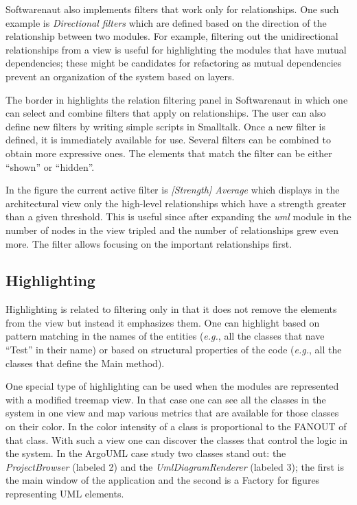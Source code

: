 \documentclass[preprint,12pt]{elsarticle}
\newcommand{\cd}[1]{{\em{#1}}}
\newcommand\on[1]{\nbc{ON}{#1}{red}} %
\newcommand{\eg}{\emph{e.g.},\xspace}
\begin{document}
Softwarenaut also implements filters that work only for relationships. One such example is {\em Directional filters} which are defined based on the direction of the relationship between two modules. For example, filtering out the unidirectional relationships from a view is useful for highlighting the modules that have mutual dependencies; these might be candidates for refactoring as mutual dependencies prevent an organization of the system based on layers.

The border in  highlights the relation filtering panel in Softwarenaut in which one can select and combine filters that apply on relationships. The user can also define new filters by writing simple scripts in Smalltalk. Once a new filter is defined, it is immediately available for use. Several filters can be combined to obtain more expressive ones. The elements that match the filter can be either ``shown'' or ``hidden''. 

In the figure the current active filter is {\em [Strength] Average} which displays in the architectural view only the high-level relationships which have a strength greater than a given threshold. This is useful since after expanding the \cd{uml} module in  the number of nodes in the view tripled and the number of relationships grew even more. The filter allows focusing on the important relationships first. 




\subsection {Highlighting}
\label{sec:high}
Highlighting is related to filtering only in that it does not remove the elements from the view but instead it emphasizes them. One can highlight based on pattern matching in the names of the entities (\eg all the classes that nave ``Test'' in their name) or based on structural properties of the code (\eg all the classes that define the Main method). 

One special type of highlighting can be used when the modules are represented with a modified treemap view. In that case one can see all the classes in the system in one view and map various metrics that are available for those classes on their color. In  the color intensity of a class is proportional to the FANOUT of that class. 
With such a view one can discover the classes that control the logic in the system. In the ArgoUML case study two classes stand out: the \cd{ProjectBrowser} (labeled 2) and the \cd{UmlDiagramRenderer} (labeled 3); the first is the main window of the application and the second is a Factory for figures representing UML elements.
\end{document}
